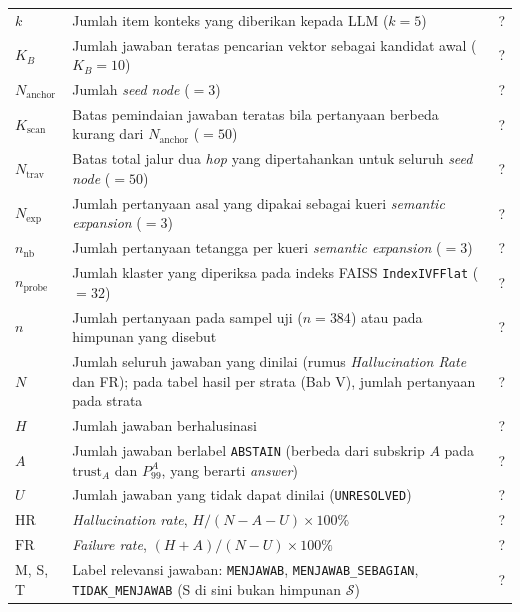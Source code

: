 \begin{longtable}{@{} l >{\raggedright\arraybackslash}p{6.5cm} c @{}}
$k$ & Jumlah item konteks yang diberikan kepada LLM ($k=5$) & ? \\
$K_B$ & Jumlah jawaban teratas pencarian vektor sebagai kandidat awal ($K_B=10$) & ? \\
$N_{\mathrm{anchor}}$ & Jumlah \emph{seed node} ($=3$) & ? \\
$K_{\mathrm{scan}}$ & Batas pemindaian jawaban teratas bila pertanyaan berbeda kurang dari $N_{\mathrm{anchor}}$ ($=50$) & ? \\
$N_{\mathrm{trav}}$ & Batas total jalur dua \emph{hop} yang dipertahankan untuk seluruh \emph{seed node} ($=50$) & ? \\
$N_{\mathrm{exp}}$ & Jumlah pertanyaan asal yang dipakai sebagai kueri \emph{semantic expansion} ($=3$) & ? \\
$n_{\mathrm{nb}}$ & Jumlah pertanyaan tetangga per kueri \emph{semantic expansion} ($=3$) & ? \\
$n_{\mathrm{probe}}$ & Jumlah klaster yang diperiksa pada indeks FAISS \texttt{IndexIVFFlat} ($=32$) & ? \\[1ex]


$n$ & Jumlah pertanyaan pada sampel uji ($n=384$) atau pada himpunan yang disebut & ? \\
$N$ & Jumlah seluruh jawaban yang dinilai (rumus \emph{Hallucination Rate} dan FR); pada tabel hasil per strata (Bab V), jumlah pertanyaan pada strata & ? \\
$H$ & Jumlah jawaban berhalusinasi & ? \\
$A$ & Jumlah jawaban berlabel \texttt{ABSTAIN} (berbeda dari subskrip $A$ pada $\mathrm{trust}_A$ dan $P_{99}^{A}$, yang berarti \emph{answer}) & ? \\
$U$ & Jumlah jawaban yang tidak dapat dinilai (\texttt{UNRESOLVED}) & ? \\
$\mathrm{HR}$ & \emph{Hallucination rate}, $H/(N-A-U)\times 100\%$ & ? \\
$\mathrm{FR}$ & \emph{Failure rate}, $(H+A)/(N-U)\times 100\%$ & ? \\
M, S, T & Label relevansi jawaban: \texttt{MENJAWAB}, \texttt{MENJAWAB\_SEBAGIAN}, \texttt{TIDAK\_MENJAWAB} (S di sini bukan himpunan $\mathcal{S}$) & ? \\

\end{longtable}